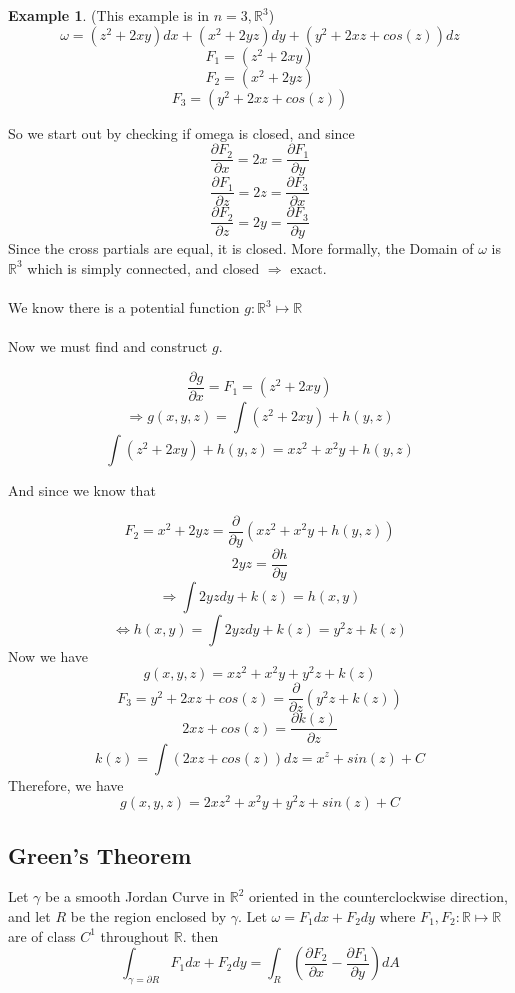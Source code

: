 \documentclass[12pt]{article}
\theoremstyle{plain}
\theoremstyle{definition}
\newtheorem{example}[theorem]{Example}
\begin{document}
	\begin{example}
		(This example is in $n=3, \mathbb{R}^3$)\\

		$$\omega = (z^2 + 2xy)dx + (x^2 +2yz)dy + (y^2 + 2xz + cos(z))dz$$
		$$F_1 = (z^2 + 2xy)$$
		$$F_2 = (x^2 +2yz)$$
		$$F_3 = (y^2 + 2xz + cos(z))$$

		So we start out by checking if omega is closed, and since
		$$\frac{\partial F_2}{\partial x} = 2x = \frac{\partial F_1}{\partial y}$$
		$$\frac{\partial F_1}{\partial z} = 2z = \frac{\partial F_3}{\partial x}$$
		$$\frac{\partial F_2}{\partial z} = 2y = \frac{\partial F_3}{\partial y}$$
		Since the cross partials are equal, it is closed. More formally, the Domain of $\omega$ is $\mathbb{R}^3$ which is simply connected, and closed $\Longrightarrow$ exact.\\
		\\
		We know there is a potential function $g:\mathbb{R}^3 \mapsto \mathbb{R}$\\
		\\
		Now we must find and construct $g$.

		$$\frac{\partial g}{\partial x} = F_1 = (z^2 + 2xy)$$
		$$\Longrightarrow g(x,y,z) = \int (z^2 + 2xy) + h(y,z)$$
		$$\int (z^2 + 2xy) + h(y,z) =  xz^2 + x^2y + h(y,z)$$

		And since we know that

		$$F_2 = x^2 + 2yz = \frac{\partial}{\partial y} (xz^2 + x^2y + h(y,z))$$
		$$2yz = \frac{\partial h}{\partial y}$$
		$$\Longrightarrow \int 2yz dy + k(z) = h(x,y)$$
		$$\Longleftrightarrow h(x,y) = \int 2yz dy + k(z) = y^2 z + k(z)$$
		Now we have
		$$g(x,y,z) = xz^2 + x^2y + y^2 z + k(z)$$
		$$F_3 = y^2 + 2xz + cos(z) = \frac{\partial}{\partial z}(y^2 z + k(z))$$
		$$2xz + cos(z) = \frac{\partial k(z)}{\partial z}$$
		$$k(z) = \int (2xz + cos(z)) dz = x^z + sin(z) + C$$
		Therefore, we have
		$$g(x,y,z) = 2xz^2 + x^2 y + y^2 z + sin(z) + C$$

	\end{example}

	\subsection{Green's Theorem}

	\begin{Theorem}
		Let $\gamma$ be a smooth Jordan Curve in $\mathbb{R}^2$ oriented in the counterclockwise direction, and let $R$ be the region enclosed by $\gamma$. Let $\omega = F_1 dx + F_2 dy$ where $F_1, F_2 : \mathbb{R} \mapsto \mathbb{R}$ are of class $C^1$ throughout $\mathbb{R}$. then
		$$\int_{\gamma = \partial R} F_1 dx + F_2 dy = \int_R (\frac{\partial F_2}{\partial x} - \frac{\partial F_1}{\partial y})dA$$
	\end{Theorem}
\end{document}
